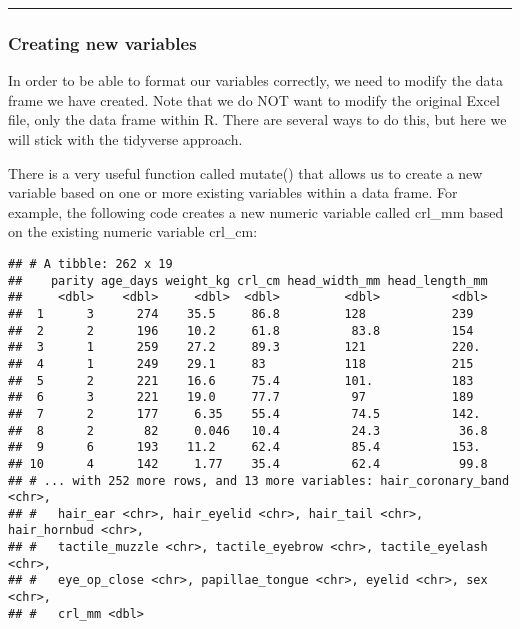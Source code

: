 \documentclass[
]{article}
\newenvironment{Shaded}{\begin{snugshade}}{\end{snugshade}}
\newcommand{\DataTypeTok}[1]{\textcolor[rgb]{0.13,0.29,0.53}{#1}}
\newcommand{\DecValTok}[1]{\textcolor[rgb]{0.00,0.00,0.81}{#1}}
\newcommand{\KeywordTok}[1]{\textcolor[rgb]{0.13,0.29,0.53}{\textbf{#1}}}
\newcommand{\NormalTok}[1]{#1}
\newcommand{\OperatorTok}[1]{\textcolor[rgb]{0.81,0.36,0.00}{\textbf{#1}}}
\newcommand{\StringTok}[1]{\textcolor[rgb]{0.31,0.60,0.02}{#1}}
\begin{document}
\begin{center}\rule{0.5\linewidth}{0.5pt}\end{center}

\hypertarget{creating-new-variables}{%
\subsubsection{Creating new variables}\label{creating-new-variables}}

In order to be able to format our variables correctly, we need to modify
the data frame we have created. Note that we do NOT want to modify the
original Excel file, only the data frame within R. There are several
ways to do this, but here we will stick with the tidyverse approach.

There is a very useful function called mutate() that allows us to create
a new variable based on one or more existing variables within a data
frame. For example, the following code creates a new numeric variable
called crl\_mm based on the existing numeric variable crl\_cm:

\begin{Shaded}
\end{Shaded}

\begin{verbatim}
## # A tibble: 262 x 19
##    parity age_days weight_kg crl_cm head_width_mm head_length_mm
##     <dbl>    <dbl>     <dbl>  <dbl>         <dbl>          <dbl>
##  1      3      274    35.5     86.8         128            239  
##  2      2      196    10.2     61.8          83.8          154  
##  3      1      259    27.2     89.3         121            220. 
##  4      1      249    29.1     83           118            215  
##  5      2      221    16.6     75.4         101.           183  
##  6      3      221    19.0     77.7          97            189  
##  7      2      177     6.35    55.4          74.5          142. 
##  8      2       82     0.046   10.4          24.3           36.8
##  9      6      193    11.2     62.4          85.4          153. 
## 10      4      142     1.77    35.4          62.4           99.8
## # ... with 252 more rows, and 13 more variables: hair_coronary_band <chr>,
## #   hair_ear <chr>, hair_eyelid <chr>, hair_tail <chr>, hair_hornbud <chr>,
## #   tactile_muzzle <chr>, tactile_eyebrow <chr>, tactile_eyelash <chr>,
## #   eye_op_close <chr>, papillae_tongue <chr>, eyelid <chr>, sex <chr>,
## #   crl_mm <dbl>
\end{verbatim}
\end{document}
